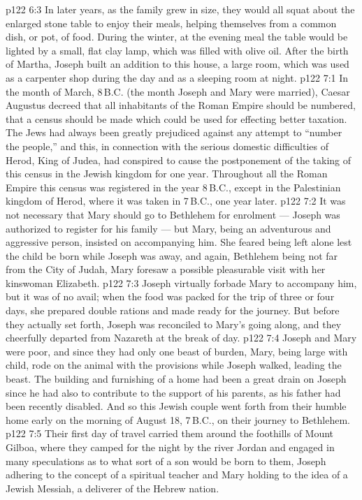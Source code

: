 \vs p122 6:3 In later years, as the family grew in size, they would all squat about the enlarged stone table to enjoy their meals, helping themselves from a common dish, or pot, of food. During the winter, at the evening meal the table would be lighted by a small, flat clay lamp, which was filled with olive oil. After the birth of Martha, Joseph built an addition to this house, a large room, which was used as a carpenter shop during the day and as a sleeping room at night.
\vs p122 7:1 In the month of March, 8\,B.C. (the month Joseph and Mary were married), Caesar Augustus decreed that all inhabitants of the Roman Empire should be numbered, that a census should be made which could be used for effecting better taxation. The Jews had always been greatly prejudiced against any attempt to “number the people,” and this, in connection with the serious domestic difficulties of Herod, King of Judea, had conspired to cause the postponement of the taking of this census in the Jewish kingdom for one year. Throughout all the Roman Empire this census was registered in the year 8\,B.C., except in the Palestinian kingdom of Herod, where it was taken in 7\,B.C., one year later.
\vs p122 7:2 It was not necessary that Mary should go to Bethlehem for enrolment --- Joseph was authorized to register for his family --- but Mary, being an adventurous and aggressive person, insisted on accompanying him. She feared being left alone lest the child be born while Joseph was away, and again, Bethlehem being not far from the City of Judah, Mary foresaw a possible pleasurable visit with her kinswoman Elizabeth.
\vs p122 7:3 Joseph virtually forbade Mary to accompany him, but it was of no avail; when the food was packed for the trip of three or four days, she prepared double rations and made ready for the journey. But before they actually set forth, Joseph was reconciled to Mary’s going along, and they cheerfully departed from Nazareth at the break of day.
\vs p122 7:4 Joseph and Mary were poor, and since they had only one beast of burden, Mary, being large with child, rode on the animal with the provisions while Joseph walked, leading the beast. The building and furnishing of a home had been a great drain on Joseph since he had also to contribute to the support of his parents, as his father had been recently disabled. And so this Jewish couple went forth from their humble home early on the morning of August 18, 7\,B.C., on their journey to Bethlehem.
\vs p122 7:5 Their first day of travel carried them around the foothills of Mount Gilboa, where they camped for the night by the river Jordan and engaged in many speculations as to what sort of a son would be born to them, Joseph adhering to the concept of a spiritual teacher and Mary holding to the idea of a Jewish Messiah, a deliverer of the Hebrew nation.
